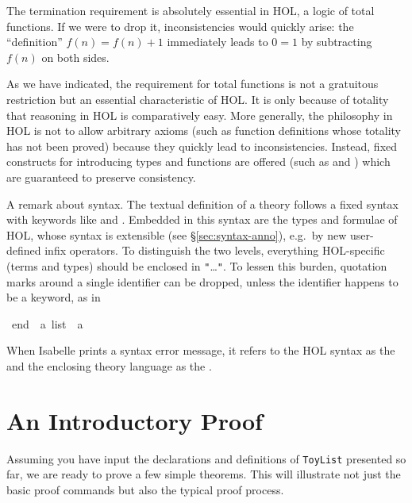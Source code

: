 \begin{isabellebody}
\begin{isamarkuptext}
The termination requirement is absolutely essential in HOL, a logic of total
functions. If we were to drop it, inconsistencies would quickly arise: the
``definition'' $f(n) = f(n)+1$ immediately leads to $0 = 1$ by subtracting
$f(n)$ on both sides.

\begin{warn}
  As we have indicated, the requirement for total functions is not a gratuitous
  restriction but an essential characteristic of HOL\@. It is only
  because of totality that reasoning in HOL is comparatively easy.  More
  generally, the philosophy in HOL is not to allow arbitrary axioms (such as
  function definitions whose totality has not been proved) because they
  quickly lead to inconsistencies. Instead, fixed constructs for introducing
  types and functions are offered (such as  and
  ) which are guaranteed to preserve consistency.
\end{warn}

A remark about syntax.  The textual definition of a theory follows a fixed
syntax with keywords like  and .
Embedded in this syntax are the types and formulae of HOL, whose syntax is
extensible (see \S\ref{sec:syntax-anno}), e.g.\ by new user-defined infix operators.
To distinguish the two levels, everything
HOL-specific (terms and types) should be enclosed in
\texttt{"}\dots\texttt{"}. 
To lessen this burden, quotation marks around a single identifier can be
dropped, unless the identifier happens to be a keyword, as in%
\end{isamarkuptext}%
\ {\isachardoublequote}end{\isachardoublequote}\ {\isacharcolon}{\isacharcolon}\ {\isachardoublequote}{\isacharprime}a\ list\ {\isasymRightarrow}\ {\isacharprime}a{\isachardoublequote}%
\begin{isamarkuptext}%
\noindent
When Isabelle prints a syntax error message, it refers to the HOL syntax as
the  and the enclosing theory language as the .


\section{An Introductory Proof}
\label{sec:intro-proof}

Assuming you have input the declarations and definitions of \texttt{ToyList}
presented so far, we are ready to prove a few simple theorems. This will
illustrate not just the basic proof commands but also the typical proof
process.


\end{isamarkuptext}
\end{isabellebody}
